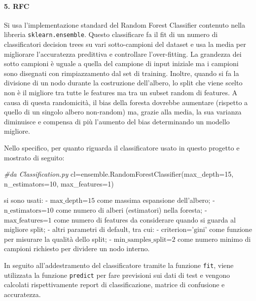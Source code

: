 \documentclass[11pt]{article}
\newenvironment{Shaded}{}{}
\newcommand{\DecValTok}[1]{\textcolor[rgb]{0.25,0.63,0.44}{{#1}}}
\newcommand{\CommentTok}[1]{\textcolor[rgb]{0.38,0.63,0.69}{\textit{{#1}}}}
\newcommand{\NormalTok}[1]{{#1}}
\newcommand{\OperatorTok}[1]{\textcolor[rgb]{0.40,0.40,0.40}{{#1}}}
\begin{document}
    \paragraph{5. RFC}\label{rfc}

    Si usa l'implementazione standard del Random Forest Classifier contenuto
nella libreria \texttt{sklearn.ensemble}. Questo classificare fa il fit
di un numero di classificatori decision trees su vari sotto-campioni del
dataset e usa la media per migliorare l'accuratezza predittiva e
controllare l'over-fitting. La grandezza dei sotto campioni è uguale a
quella del campione di input iniziale ma i campioni sono disegnati con
rimpiazzamento dal set di training. Inoltre, quando si fa la divisione
di un nodo durante la costruzione dell'albero, lo split che viene scelto
non è il migliore tra tutte le features ma tra un subset random di
features. A causa di questa randomicità, il bias della foresta dovrebbe
aumentare (rispetto a quello di un singolo albero non-random) ma, grazie
alla media, la sua varianza diminuisce e compensa di più l'aumento del
bias determinando un modello migliore.

Nello specifico, per quanto riguarda il classificatore usato in questo
progetto e mostrato di seguito:

\begin{Shaded}
\begin{Highlighting}[]
\CommentTok{#da Classification.py}
\NormalTok{cl}\OperatorTok{=}\NormalTok{ensemble.RandomForestClassifier(max_depth}\OperatorTok{=}\DecValTok{15}\NormalTok{, n_estimators}\OperatorTok{=}\DecValTok{10}\NormalTok{, max_features}\OperatorTok{=}\DecValTok{1}\NormalTok{)      }
\end{Highlighting}
\end{Shaded}

si sono usati: - \(\text{max_depth=15}\) come massima espansione
dell'albero; - \(\text{n_estimators=10}\) come numero di alberi
(estimatori) nella foresta; - \(\text{max_features=1}\) come numero di
features da considerare quando si guarda al migliore split; - altri
parametri di default, tra cui: - \(\text{criterion='gini'}\) come
funzione per misurare la qualità dello split; -
\(\text{min_samples_split=2}\) come numero minimo di campioni richiesto
per dividere un nodo interno.

In seguito all'addestramento del classificatore tramite la funzione
\texttt{fit}, viene utilizzata la funzione \texttt{predict} per fare
previsioni sui dati di test e vengono calcolati rispettivamente report
di classificazione, matrice di confusione e accuratezza.
\end{document}
